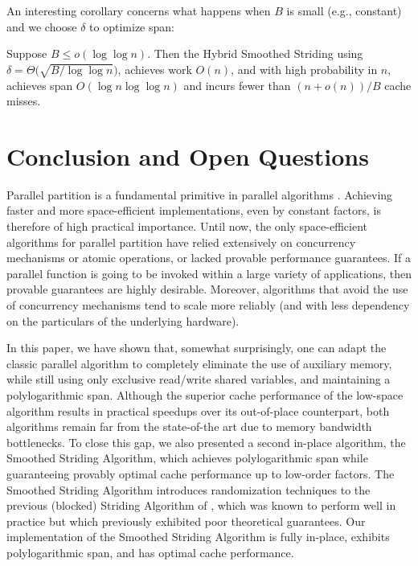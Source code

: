 \documentclass[a4paper,UKenglish,cleveref, autoref, thm-restate]{lipics-v2019}
\begin{document}
An interesting corollary concerns what happens when $B$ is small
(e.g., constant) and we choose $\delta$ to optimize span:

\begin{corollary}
Suppose $B \le o(\log \log n)$. Then the Hybrid Smoothed Striding
using $\delta = \Theta\big(\sqrt{B/\log\log n}\big)$, achieves
work $O(n)$, and with high probability in $n$, achieves span
$O(\log n \log\log n)$ and incurs fewer than $(n+o(n))/B$ cache misses.
\end{corollary}





\section{Conclusion and Open Questions}\label{sec:open}

Parallel partition is a fundamental primitive in parallel algorithms
\cite{Blelloch96,AcarBl16}. Achieving faster and more space-efficient
implementations, even by constant factors, is therefore of high
practical importance. Until now, the only space-efficient algorithms
for parallel partition have relied extensively on concurrency
mechanisms or atomic operations, or lacked provable performance
guarantees. If a parallel function is going to be invoked within a large
variety of applications, then provable guarantees are highly
desirable. Moreover, algorithms that avoid the use of concurrency
mechanisms tend to scale more reliably (and with less dependency on
the particulars of the underlying hardware).

In this paper, we have shown that, somewhat surprisingly, one can
adapt the classic parallel algorithm to completely eliminate the
use of auxiliary memory, while still using only exclusive
read/write shared variables, and maintaining a polylogarithmic
span. Although the superior cache performance of the low-space
algorithm results in practical speedups over its out-of-place
counterpart, both algorithms remain far from the state-of-the art
due to memory bandwidth bottlenecks. To close this gap, we also
presented a second in-place algorithm, the Smoothed Striding
Algorithm, which achieves polylogarithmic span while guaranteeing
provably optimal cache performance up to low-order factors. The
Smoothed Striding Algorithm introduces randomization techniques
to the previous (blocked) Striding Algorithm of \cite{Frias08,
FrancisPa92}, which was known to perform well in practice but
which previously exhibited poor theoretical guarantees. Our
implementation of the Smoothed Striding Algorithm is fully
in-place, exhibits polylogarithmic span, and has optimal cache
performance.
\end{document}
